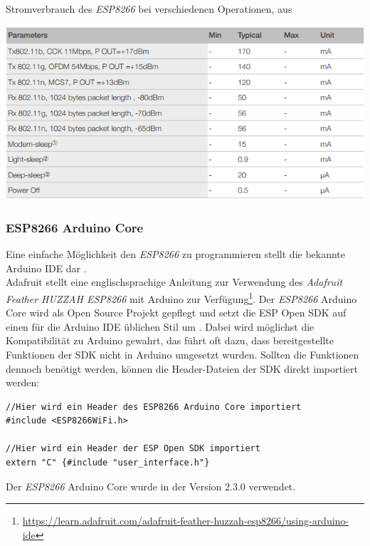 \begin{table}[h]
  \centering
  \caption{Stromverbrauch des \emph{ESP8266} bei verschiedenen Operationen, aus \cite{espressif2017ESP8266}}
	\includegraphics[width=\textwidth]{images/esppower.png}

  \label{table:esppower}
\end{table}


\subsubsection{ESP8266 Arduino Core}
Eine einfache Möglichkeit den \emph{ESP8266} zu programmieren stellt die bekannte Arduino IDE dar \cite{banzi2017arduino}.\\
Adafruit stellt eine englischsprachige Anleitung zur Verwendung des \textit{Adafruit Feather HUZZAH ESP8266} mit Arduino zur Verfügung\footnote{\url{https://learn.adafruit.com/adafruit-feather-huzzah-esp8266/using-arduino-ide}}.
Der \emph{ESP8266} Arduino Core wird als Open Source Projekt gepflegt und setzt die ESP Open SDK auf einen für die Arduino IDE üblichen Stil um \cite{arduino2017core}. 
Dabei wird möglichst die Kompatibilität zu Arduino gewahrt, das führt oft dazu, dass bereitgestellte Funktionen der SDK nicht in Arduino umgesetzt wurden.
Sollten die Funktionen dennoch benötigt werden, können die Header-Dateien der SDK direkt importiert werden:

\begin{verbatim}
//Hier wird ein Header des ESP8266 Arduino Core importiert
#include <ESP8266WiFi.h> 

//Hier wird ein Header der ESP Open SDK importiert
extern "C" {#include "user_interface.h"} 
\end{verbatim}

Der \emph{ESP8266} Arduino Core wurde in der Version 2.3.0 verwendet.

